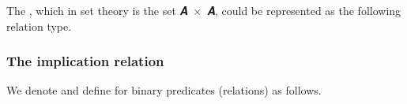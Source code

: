 The , which in set theory is the set \ab 𝑨~\af ×~\ab 𝑨, could be represented as the following relation type.

\begin{code}



\subsubsection{The implication relation}\label{implication}

We denote and define  for binary predicates (relations) as follows.
\ccpad
\begin{code}%
\>[0]\AgdaSpace{}%
\AgdaSymbol{:}\AgdaSpace{}%
\AgdaSymbol{(}\AgdaSpace{}%
\AgdaSpace{}%
\AgdaSpace{}%
\AgdaSpace{}%
\AgdaSymbol{)}\AgdaSpace{}%
\AgdaSpace{}%
\AgdaSymbol{(}\AgdaSpace{}%
\AgdaSpace{}%
\AgdaSymbol{)}\AgdaSpace{}%
\AgdaSpace{}%
\AgdaSymbol{(}\AgdaSpace{}%
\AgdaSpace{}%
\AgdaSpace{}%
\AgdaSpace{}%
\AgdaSymbol{)}\<%
\\
%
\>[0]\AgdaSpace{}%
\AgdaSpace{}%
\AgdaSpace{}%
\AgdaSymbol{=}\AgdaSpace{}%
\AgdaSpace{}%
\AgdaSpace{}%
\AgdaSpace{}%
\AgdaSpace{}%
\AgdaSpace{}%
\AgdaSymbol{(}\AgdaSpace{}%
\AgdaSymbol{)}\AgdaSpace{}%
\AgdaSymbol{(}\AgdaSpace{}%
\AgdaSymbol{)}\<%
\\

\end{code}
\end{code}
